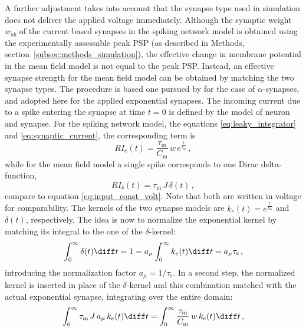 A further adjustment takes into account that the synapse type used in simulation does not
deliver the applied voltage immediately. Although the synaptic weight $w_{ab}$ of the 
current based synapses in the spiking network model is obtained using the experimentally 
assessable peak PSP (as described in Methods, section~\ref{subsec:methods_simulation}), 
the effective change in membrane potential in the mean field model is not equal to the peak PSP. 
Instead, an effective synapse strength for the mean field model can be obtained by 
matching the two synapse types.
The procedure is based one pursued by 
for the case of $\alpha$-synapses, and adopted here for the applied 
exponential synapses. 
The incoming current due to a spike entering the synapse at time $t = 0$ is defined 
by the model of neuron and synapse. For the spiking network model, the equations 
\eqref{eq:leaky_integrator} and \eqref{eq:synaptic_current}, the corresponding term is
\begin{equation}
    RI_e(t) = \frac{\tau_\text{m}}{C_\text{m}} \,w \,e^{\frac{t}{\tau_\text{m}}}\,,
    \label{eq:input_exp}
\end{equation}
while for the mean field model a single spike corresponds to one Dirac delta-function, 
\begin{equation}
    RI_\delta(t) = \tau_\text{m} \, J \,\delta(t)\,,
    \label{eq:input_exp}
\end{equation}
compare to equation \eqref{eq:input_const_volt}. Note that both are written in voltage for 
comparability. The kernels of the two synapse models are $k_e(t) = e^{\frac{t}{\tau_\text{m}}}$
and $\delta(t)$, respectively. 
The idea is now to normalize the exponential kernel by matching its 
integral to the one of the $\delta$-kernel:
\begin{equation}
    \int_{0}^{\infty}\delta(t)\diff t 
        = 1 
        = a_\mu \int_{0}^{\infty}k_e(t)\diff t  
        = a_\mu \tau_\text{s} \,,
    \label{eq:match_k_e}
\end{equation}
introducing the normalization factor $a_\mu = 1 / \tau_\text{s} $. 
In a second step, the normalized kernel is inserted
in place of the $\delta$-kernel and this combination matched with the actual 
exponential synapse, integrating over the entire domain:
\begin{equation}
    \int_{0}^{\infty} \tau_\text{m} \,J \,a_\mu\, k_e(t) \diff t 
        = \int_{0}^{\infty} \frac{\tau_\text{m} }{C_\text{m}} \,w\, k_e(t)\diff t  \,,
    \label{eq:match_syns}
\end{equation}

